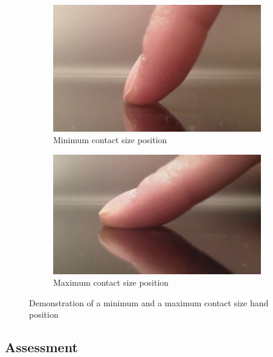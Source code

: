 \begin{figure}[H]
\centering
\begin{subfigure}[b]{0.4\textwidth}
	\centering
	\includegraphics[width=\textwidth]{figures/ffmin}
	\caption{Minimum contact size position}
	\label{fig:ffmin}
\end{subfigure}
\hfill
\begin{subfigure}[b]{0.4\textwidth}
	\centering
	\includegraphics[width=\textwidth]{figures/ffmax}
	\caption{Maximum contact size position}
	\label{fig:ffmax}
\end{subfigure}
\caption{Demonstration of a minimum and a maximum contact size hand position}
\label{fig:ffMinMax}
\end{figure}

\subsection{Assessment}
\label{assessment}


